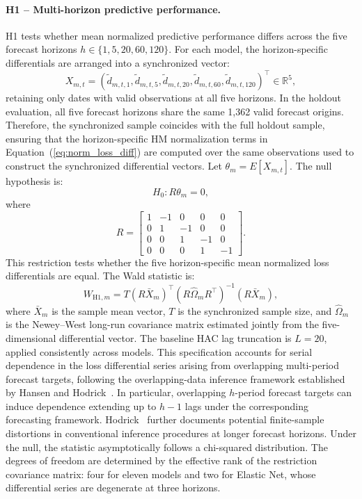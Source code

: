 \documentclass[runningheads,orivec]{llncs}
\begin{document}
\paragraph{H1 -- Multi-horizon predictive performance.} H1 tests whether mean normalized predictive performance differs across the five forecast horizons $h\in\{1,5,20,60,120\}$. For each model, the horizon-specific differentials are arranged into a synchronized vector:
\[
X_{m,t}
=
\left(
\widetilde d_{m,t,1},
\widetilde d_{m,t,5},
\widetilde d_{m,t,20},
\widetilde d_{m,t,60},
\widetilde d_{m,t,120}
\right)^\top
\in\mathbb{R}^5,
\]
retaining only dates with valid observations at all five horizons. In the holdout evaluation, all five forecast horizons share the same 1,362 valid forecast origins. Therefore, the synchronized sample coincides with the full holdout sample, ensuring that the horizon-specific HM normalization terms in Equation~(\ref{eq:norm_loss_diff}) are computed over the same observations used to construct the synchronized differential vectors. Let $\theta_m=E[X_{m,t}]$. The null hypothesis is:
\begin{equation}
H_0:R\theta_m=0,
\end{equation}
where
\begin{equation}
R=
\begin{bmatrix}
1&-1&0&0&0\\
0&1&-1&0&0\\
0&0&1&-1&0\\
0&0&0&1&-1
\end{bmatrix}.
\end{equation}
This restriction tests whether the five horizon-specific mean normalized loss differentials are equal. The Wald statistic is:
\begin{equation}
W_{\mathrm{H1},m}
=
T(R\bar X_m)^\top
\left(R\widehat\Omega_mR^\top\right)^{-1}
(R\bar X_m),
\end{equation}
where $\bar X_m$ is the sample mean vector, $T$ is the synchronized sample size, and $\widehat\Omega_m$ is the Newey--West long-run covariance matrix estimated jointly from the five-dimensional differential vector. The baseline HAC lag truncation is $L=20$, applied consistently across models. This specification accounts for serial dependence in the loss differential series arising from overlapping multi-period forecast targets, following the overlapping-data inference framework established by Hansen and Hodrick~\cite{hansen1980}. In particular, overlapping $h$-period forecast targets can induce dependence extending up to $h-1$ lags under the corresponding forecasting framework. Hodrick~\cite{hodrick1992} further documents potential finite-sample distortions in conventional inference procedures at longer forecast horizons. Under the null, the statistic asymptotically follows a chi-squared distribution. The degrees of freedom are determined by the effective rank of the restriction covariance matrix: four for eleven models and two for Elastic Net, whose differential series are degenerate at three horizons.
\end{document}
